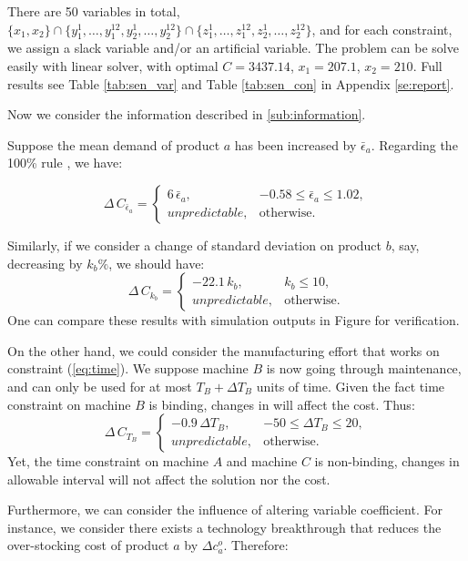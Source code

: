 \documentclass[a4paper,11pt]{article}
\begin{document}
There are 50 variables in total, $\big\{ x_1,x_2 \big\} \cap \big\{ y_1^1,\dots,y_1^{12},y_2^1,\dots,y_2^{12} \big\} \cap \big\{ z_1^1,\dots,z_1^{12},z_2^1,\dots,z_2^{12} \big\}$, and for each constraint, we assign a slack variable and/or an artificial variable. The problem can be solve easily with linear solver, with optimal $C=3437.14$, $x_1=207.1$, $x_2=210$. Full results see Table \ref{tab:sen_var} and Table \ref{tab:sen_con} in Appendix \ref{se:report}.

Now we consider the information described in \ref{sub:information}.

Suppose the mean demand of product $a$ has been increased by $\bar{\epsilon}_a$. Regarding the 100\% rule \cite{BHM77}, we have:

\[
    \Delta \, C_{\bar{\epsilon}_a} = 
    \begin{cases}
        6 \, \bar{\epsilon}_a, & -0.58 \leq \bar{\epsilon}_a \leq 1.02,\\
        unpredictable, & \text{otherwise}.
    \end{cases}
\]

Similarly, if we consider a change of standard deviation on product $b$, say, decreasing by $k_b\%$, we should have:
\[
    \Delta \, C_{k_b} = 
    \begin{cases}
        -22.1 \, k_b, & k_b \leq 10,\\
        unpredictable, & \text{otherwise}.
    \end{cases}
\]
One can compare these results with simulation outputs in Figure for verification.

On the other hand, we could consider the manufacturing effort that works on constraint (\ref{eq:time}). We suppose machine $B$ is now going through maintenance, and can only be used for at most $T_B + \Delta T_B$ units of time. Given the fact time constraint on machine $B$ is binding, changes in will affect the cost. Thus:
\[
    \Delta \, C_{T_B} = 
    \begin{cases}
        -0.9 \, \Delta T_B, & -50 \leq \Delta T_B \leq 20,\\
        unpredictable, & \text{otherwise}.
    \end{cases}
\]
Yet, the time constraint on machine $A$ and machine $C$ is non-binding, changes in allowable interval will not affect the solution nor the cost.

Furthermore, we can consider the influence of altering variable coefficient. For instance, we consider there exists a technology breakthrough that reduces the over-stocking cost of product $a$ by $\Delta c_a^o$. Therefore:
\end{document}
